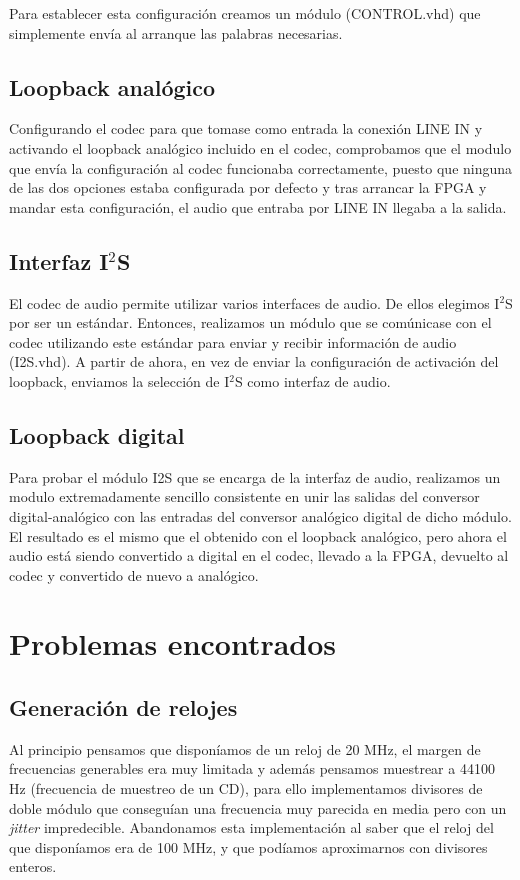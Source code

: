 		Para establecer esta configuración creamos un módulo (CONTROL.vhd) que simplemente envía al arranque las palabras necesarias.

	
 
	\subsection{Loopback analógico}

		Configurando el codec para que tomase como entrada la conexión LINE IN y activando el loopback analógico incluido en el codec, comprobamos que el modulo que envía la configuración al codec funcionaba correctamente, puesto que ninguna de las dos opciones estaba configurada por defecto y tras arrancar la FPGA y mandar esta configuración, el audio que entraba por LINE IN llegaba a la salida.
		
	
	\subsection{Interfaz I$^2$S}

		El codec de audio permite utilizar varios interfaces de audio. De ellos elegimos I$^2$S por ser un estándar. Entonces, realizamos un módulo que se comúnicase con el codec utilizando este estándar para enviar y recibir información de audio (I2S.vhd). A partir de ahora, en vez de enviar la configuración de activación del loopback, enviamos la selección de I$^2$S como interfaz de audio.

	\subsection{Loopback digital}
		
		Para probar el módulo I2S que se encarga de la interfaz de audio, realizamos un modulo extremadamente sencillo consistente en unir las salidas del conversor digital-analógico con las entradas del conversor analógico digital de dicho módulo. El resultado es el mismo que el obtenido con el loopback analógico, pero ahora el audio está siendo convertido a digital en el codec, llevado a la FPGA, devuelto al codec y convertido de nuevo a analógico.

		

	
\section{Problemas encontrados}


	\subsection{Generación de relojes}
		Al principio pensamos que disponíamos de un reloj de 20 MHz, el margen de frecuencias generables era muy limitada  y además pensamos muestrear a 44100 Hz (frecuencia de muestreo de un CD), para ello implementamos divisores de doble módulo \cite{Fraccional divider in VHDL} que conseguían una frecuencia muy parecida en media pero con un \emph{jitter} impredecible. Abandonamos esta implementación al saber que el reloj del que disponíamos era de 100 MHz, y que podíamos aproximarnos con divisores enteros.

